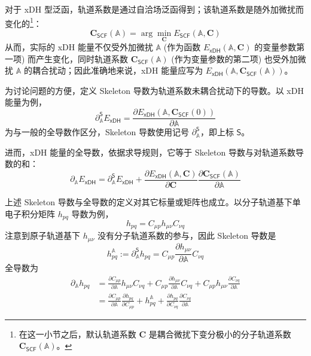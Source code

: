 对于 xDH 型泛函，轨道系数是通过自洽场泛函得到；该轨道系数是随外加微扰而变化的\footnote{在这一小节之后，默认轨道系数 $\mathbf{C}$ 是耦合微扰下变分极小的分子轨道系数 $\mathbf{C}_\textsf{SCF} (\mathbb{A})$。}：
\begin{equation*}
  \mathbf{C}_\textsf{SCF} (\mathbb{A}) = \arg \min_\mathbf{C} E_\textsf{SCF} (\mathbb{A}, \mathbf{C})
\end{equation*}
从而，实际的 xDH 能量不仅受外加微扰 $\mathbb{A}$ (作为函数 $E_\textsf{xDH} (\mathbb{A}, \mathbf{C})$ 的变量参数第一项) 而产生变化，同时轨道系数 $\mathbf{C}_\textsf{SCF} (\mathbb{A})$ (作为变量参数的第二项) 也受外加微扰 $\mathbb{A}$ 的耦合扰动；因此准确地来说，xDH 能量应写为 $E_\textsf{xDH} (\mathbb{A}, \mathbf{C}_\textsf{SCF} (\mathbb{A}))$。

为讨论问题的方便，定义 Skeleton 导数为轨道系数未耦合扰动下的导数。以 xDH 能量为例，
\begin{equation}
  \partial_\mathbb{A}^\textsf{S} E_\textsf{xDH} = \frac{\partial E_\textsf{xDH} (\mathbb{A}, \mathbf{C}_\textsf{SCF} (0))}{\partial \mathbb{A}}
\end{equation}
为与一般的全导数作区分，Skeleton 导数使用记号 $\partial_\mathbb{A}^\textsf{S}$，即上标 $\textsf{S}$。

进而，xDH 能量的全导数，依据求导规则，它等于 Skeleton 导数与对轨道系数导数的和：
\begin{equation}
  \partial_\mathbb{A} E_\textsf{xDH} = \partial_\mathbb{A}^\textsf{S} E_\textsf{xDH} + \frac{\partial E_\textsf{xDH} (\mathbb{A}, \mathbf{C})}{\partial \mathbf{C}} \frac{\partial \mathbf{C}_\textsf{SCF} (\mathbb{A})}{\partial \mathbb{A}}
\end{equation}

上述 Skeleton 导数与全导数的定义对其它标量或矩阵也成立。以分子轨道基下单电子积分矩阵 $h_{pq}$ 导数为例，
\begin{equation*}
  h_{pq} = C_{\mu p} h_{\mu \nu} C_{\nu q}
\end{equation*}
注意到原子轨道基下 $h_{\mu \nu}$ 没有分子轨道系数的参与，因此 Skeleton 导数是
\begin{equation*}
  h_{pq}^\mathbb{A} := \partial_\mathbb{A}^\textsf{S} h_{pq} = C_{\mu p} \frac{\partial h_{\mu \nu}}{\partial \mathbb{A}} C_{\nu q}
\end{equation*}
全导数为
\begin{align*}
  \partial_\mathbb{A} h_{pq}
  &= \frac{\partial C_{\mu p}}{\partial \mathbb{A}} h_{\mu \nu} C_{\nu q} + C_{\mu p} \frac{\partial h_{\mu \nu}}{\partial \mathbb{A}} C_{\nu q} + C_{\mu p} h_{\mu \nu} \frac{\partial C_{\nu q}}{\partial \mathbb{A}} \\
  &= \frac{\partial C_{\mu p}}{\partial \mathbb{A}} \frac{\partial h_{pq}}{\partial C_{\mu p}} + h_{pq}^\mathbb{A} + \frac{\partial h_{pq}}{\partial C_{\nu q}} \frac{\partial C_{\nu q}}{\partial \mathbb{A}}
\end{align*}


